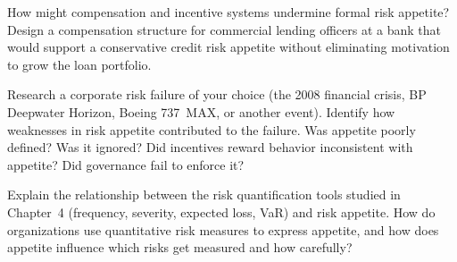 \documentclass[11pt,openany]{book}
\begin{document}
\begin{discussionquestions}
\item How might compensation and incentive systems undermine formal risk
  appetite? Design a compensation structure for commercial lending officers at
  a bank that would support a conservative credit risk appetite without
  eliminating motivation to grow the loan portfolio.

\item Research a corporate risk failure of your choice (the 2008 financial
  crisis, BP Deepwater Horizon, Boeing 737~MAX, or another event). Identify
  how weaknesses in risk appetite contributed to the failure. Was appetite
  poorly defined? Was it ignored? Did incentives reward behavior inconsistent
  with appetite? Did governance fail to enforce it?

\item Explain the relationship between the risk quantification tools studied
  in Chapter~4 (frequency, severity, expected loss, VaR) and risk appetite.
  How do organizations use quantitative risk measures to express appetite, and
  how does appetite influence which risks get measured and how carefully?
\end{discussionquestions}
\end{document}
